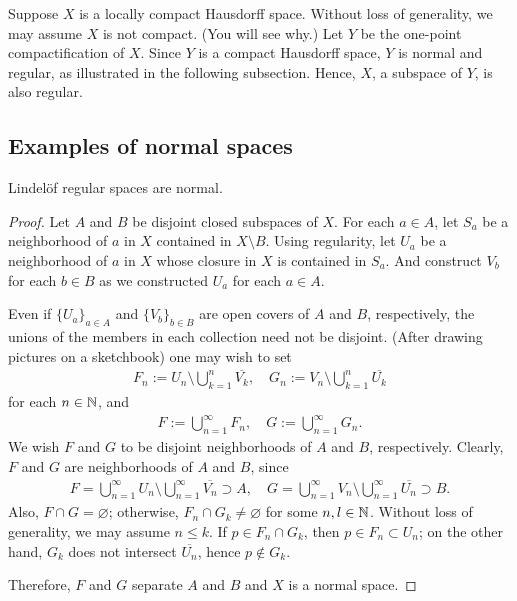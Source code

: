 \begin{exmp}
    Suppose $X$ is a locally compact Hausdorff space.
    Without loss of generality, we may assume $X$ is not compact. (You will see why.)
    Let $Y$ be the one-point compactification of $X$.
    Since $Y$ is a compact Hausdorff space, $Y$ is normal and regular, as illustrated in the following subsection.
    Hence, $X$, a subspace of $Y$, is also regular.
\end{exmp}

\subsection{Examples of normal spaces}
\begin{thm}
    Lindel\"{o}f regular spaces are normal.
\end{thm}
\begin{proof}
    Let $A$ and $B$ be disjoint closed subspaces of $X$.
    For each $a\in A$, let $S_a$ be a neighborhood of $a$ in $X$ contained in $X\setminus B$.
    Using regularity, let $U_a$ be a neighborhood of $a$ in $X$ whose closure in $X$ is contained in $S_a$.
    And construct $V_b$ for each $b\in B$ as we constructed $U_a$ for each $a\in A$.

    Even if $\{U_a\}_{a\in A}$ and $\{V_b\}_{b\in B}$ are open covers of $A$ and $B$, respectively, the unions of the members in each collection need not be disjoint.
    (After drawing pictures on a sketchbook) one may wish to set
    \begin{align*}
        F_n:=U_n\setminus\bigcup_{k=1}^n\overline{V_k},\quad G_n:=V_n\setminus\bigcup_{k=1}^n\overline{U_k}
    \end{align*}
    for each $n\in{\mathbb{N}}$, and
    \begin{align*}
        F:=\bigcup_{n=1}^\infty F_n,\quad G:=\bigcup_{n=1}^\infty G_n.
    \end{align*}
    We wish $F$ and $G$ to be disjoint neighborhoods of $A$ and $B$, respectively.
    Clearly, $F$ and $G$ are neighborhoods of $A$ and $B$, since
    \begin{align*}
        F=\bigcup_{n=1}^\infty U_n\setminus\bigcup_{n=1}^\infty\overline{V_n}\supset A,\quad G=\bigcup_{n=1}^\infty V_n\setminus\bigcup_{n=1}^\infty\overline{U_n}\supset B.
    \end{align*}
    Also, $F\cap G=\varnothing$; otherwise, $F_n\cap G_k\neq\varnothing$ for some $n, l\in{\mathbb{N}}$.
    Without loss of generality, we may assume $n\leq k$.
    If $p\in F_n\cap G_k$, then $p\in F_n\subset U_n$; on the other hand, $G_k$ does not intersect $\overline{U_n}$, hence $p\notin G_k$.
    
    Therefore, $F$ and $G$ separate $A$ and $B$ and $X$ is a normal space.
\end{proof}

